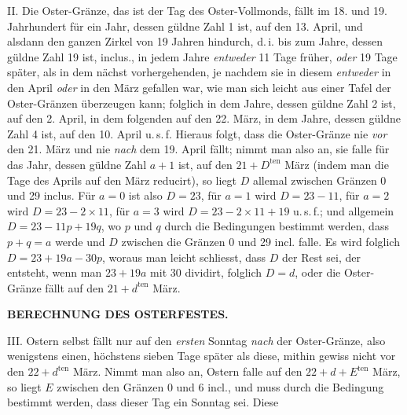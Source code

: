 II. Die Oster-Gränze, das ist der Tag des Oster-Vollmonds, fällt im 18.
und 19. Jahrhundert für ein Jahr, dessen güldne Zahl 1 ist, auf den 13. April,
und alsdann den ganzen Zirkel von 19 Jahren hindurch, d.\,i. bis zum Jahre,
dessen güldne Zahl 19 ist, inclus., in jedem Jahre \textit{entweder} 11 Tage früher, \textit{oder}
19 Tage später, als in dem nächst vorhergehenden, je nachdem sie in diesem
\textit{entweder} in den April \textit{oder} in den März gefallen war, wie man sich leicht aus einer
Tafel der Oster-Gränzen überzeugen kann; folglich in dem Jahre, dessen
güldne Zahl 2 ist, auf den 2. April, in dem folgenden auf den 22. März, in dem
Jahre, dessen güldne Zahl 4 ist, auf den 10. April u.\,s.\,f. Hieraus folgt, dass
die Oster-Gränze nie \textit{vor} den 21. März und nie \textit{nach} dem 19. April fällt; nimmt
man also an, sie falle für das Jahr, dessen güldne Zahl $a+1$ ist, auf den
$21+D^{\mathrm{ten}}$ März (indem man die Tage des Aprils auf den März reducirt), so liegt
$D$ allemal zwischen Gränzen 0 und 29 inclus. Für $a=0$ ist also $D=23$,
für $a=1$ wird $D=23-11$, für $a=2$ wird $D=23-2\times11$, für $a=3$
wird $D=23-2\times11+19$ u.\,s.\,f.; und allgemein $D=23-11p+19q$, wo $p$
und $q$ durch die Bedingungen bestimmt werden, dass $p+q=a$ werde und $D$
zwischen die Gränzen 0 und 29 incl. falle. Es wird folglich $D=23+19a-30p$,
woraus man leicht schliesst, dass $D$ der Rest sei, der entsteht, wenn man
$23+19a$ mit 30 dividirt, folglich $D=d$, oder die Oster-Gränze fällt auf den
$21+d^{\mathrm{ten}}$ März.
\par
{}
\thispagestyle{gaussVIEasterGathering}
\clearpage
\thispagestyle{empty}
\noindent{}%
%
\parbox[t]{\dimexpr\linewidth-24mm\relax}{\centering\footnotesize\bfseries BERECHNUNG DES OSTERFESTES.\par}%
\makebox[12mm][r]{}\par\nobreak\medskip
III. Ostern selbst fällt nur auf den \textit{ersten} Sonntag \textit{nach} der Oster-Gränze,
also wenigstens einen, höchstens sieben Tage später als diese, mithin gewiss
nicht vor den $22+d^{\mathrm{ten}}$ März. Nimmt man also an, Ostern falle auf den
$22+d+E^{\mathrm{ten}}$ März, so liegt $E$ zwischen den Gränzen 0 und 6 incl., und muss
durch die Bedingung bestimmt werden, dass dieser Tag ein Sonntag sei. Diese
